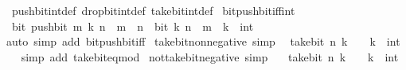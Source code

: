 \begin{isabellebody}
\ \ push{\isacharunderscore}{\kern0pt}bit{\isacharunderscore}{\kern0pt}int{\isacharunderscore}{\kern0pt}def\ drop{\isacharunderscore}{\kern0pt}bit{\isacharunderscore}{\kern0pt}int{\isacharunderscore}{\kern0pt}def\ take{\isacharunderscore}{\kern0pt}bit{\isacharunderscore}{\kern0pt}int{\isacharunderscore}{\kern0pt}def{\isacharparenright}{\kern0pt}%
\endisatagproof
{\isafoldproof}%
%
\isadelimproof
%
\endisadelimproof
\isanewline
\isanewline
{}\isamarkupfalse%
\isanewline
\isanewline
{}\isamarkupfalse%
\ bit{\isacharunderscore}{\kern0pt}push{\isacharunderscore}{\kern0pt}bit{\isacharunderscore}{\kern0pt}iff{\isacharunderscore}{\kern0pt}int{\isacharcolon}{\kern0pt}\isanewline
\ \ {\isacartoucheopen}bit\ {\isacharparenleft}{\kern0pt}push{\isacharunderscore}{\kern0pt}bit\ m\ k{\isacharparenright}{\kern0pt}\ n\ {\isasymlongleftrightarrow}\ m\ {\isasymle}\ n\ {\isasymand}\ bit\ k\ {\isacharparenleft}{\kern0pt}n\ {\isacharminus}{\kern0pt}\ m{\isacharparenright}{\kern0pt}{\isacartoucheclose}\ \ k\ {\isacharcolon}{\kern0pt}{\isacharcolon}{\kern0pt}\ int\isanewline
%
\isadelimproof
\ \ %
\endisadelimproof
%
\isatagproof
{}\isamarkupfalse%
\ {\isacharparenleft}{\kern0pt}auto\ simp\ add{\isacharcolon}{\kern0pt}\ bit{\isacharunderscore}{\kern0pt}push{\isacharunderscore}{\kern0pt}bit{\isacharunderscore}{\kern0pt}iff{\isacharparenright}{\kern0pt}%
\endisatagproof
{\isafoldproof}%
%
\isadelimproof
\isanewline
%
\endisadelimproof
\isanewline
{}\isamarkupfalse%
\ take{\isacharunderscore}{\kern0pt}bit{\isacharunderscore}{\kern0pt}nonnegative\ {\isacharbrackleft}{\kern0pt}simp{\isacharbrackright}{\kern0pt}{\isacharcolon}{\kern0pt}\isanewline
\ \ {\isacartoucheopen}take{\isacharunderscore}{\kern0pt}bit\ n\ k\ {\isasymge}\ {}{\isacartoucheclose}\ \ k\ {\isacharcolon}{\kern0pt}{\isacharcolon}{\kern0pt}\ int\isanewline
%
\isadelimproof
\ \ %
\endisadelimproof
%
\isatagproof
{}\isamarkupfalse%
\ {\isacharparenleft}{\kern0pt}simp\ add{\isacharcolon}{\kern0pt}\ take{\isacharunderscore}{\kern0pt}bit{\isacharunderscore}{\kern0pt}eq{\isacharunderscore}{\kern0pt}mod{\isacharparenright}{\kern0pt}%
\endisatagproof
{\isafoldproof}%
%
\isadelimproof
\isanewline
%
\endisadelimproof
\isanewline
{}\isamarkupfalse%
\ not{\isacharunderscore}{\kern0pt}take{\isacharunderscore}{\kern0pt}bit{\isacharunderscore}{\kern0pt}negative\ {\isacharbrackleft}{\kern0pt}simp{\isacharbrackright}{\kern0pt}{\isacharcolon}{\kern0pt}\isanewline
\ \ {\isacartoucheopen}{\isasymnot}\ take{\isacharunderscore}{\kern0pt}bit\ n\ k\ {\isacharless}{\kern0pt}\ {}{\isacartoucheclose}\ \ k\ {\isacharcolon}{\kern0pt}{\isacharcolon}{\kern0pt}\ int\isanewline

\end{isabellebody}
